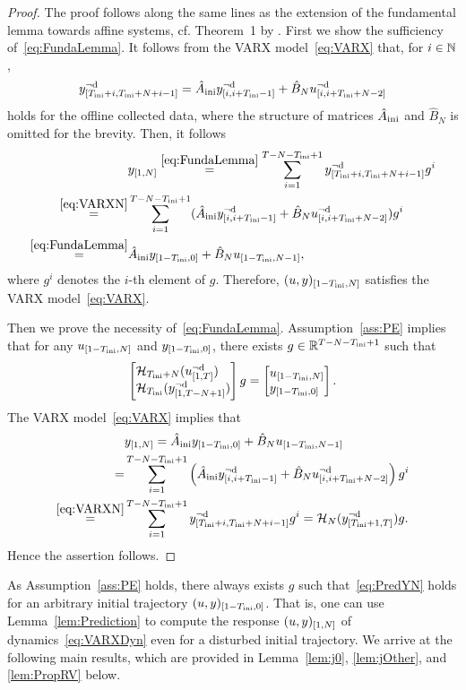 \begin{proof}
	The proof follows along the same lines as the extension of the fundamental lemma towards affine systems, cf. Theorem~1 by \citet{berberich22linear}. First we show the sufficiency of~\eqref{eq:FundaLemma}. It follows from the VARX model~\eqref{eq:VARX} that, for $i\in\mathbb{N}$,
	\begin{equation}\label{eq:VARXN}
		y_{[T_\text{ini}+i,T_\text{ini}+N+i-1]}^{\neg\mathrm{d}} = \hat{A}_{\text{ini}} y_{[i,i+T_\text{ini}-1]}^{\neg\mathrm{d}} + \hat{B}_Nu_{[i,i+T_\text{ini}+N-2]}^{\neg\mathrm{d}}
	\end{equation}
	holds for the offline collected data, where the structure of matrices $\hat{A}_{\text{ini}}$ and $\hat{B}_N$ is omitted for the brevity. Then, it follows
	\begin{align*}
		&y_{[1,N]} \overset{\eqref{eq:FundaLemma}}{=} \sum_{i=1}^{T-N-T_\text{ini}+1} y_{[T_\text{ini}+i,T_\text{ini}+N+i-1]}^{\neg\mathrm{d}}g^i\\
		\overset{\eqref{eq:VARXN}}{=} &\sum_{i=1}^{T-N-T_\text{ini}+1}  ( \hat{A}_{\text{ini}} y_{[i,i+T_\text{ini}-1]}^{\neg\mathrm{d}} + \hat{B}_Nu_{[i,i+T_\text{ini}+N-2]}^{\neg\mathrm{d}})g^i\\
		\overset{\eqref{eq:FundaLemma}}{=} &\hat{A}_{\text{ini}}y_{[1-T_\text{ini},0]} + \hat{B}_Nu_{[1-T_\text{ini},N-1]},
	\end{align*}
	where $g^i$ denotes the $i$-th element of $g$. Therefore,  $(u,y)_{[1-T_\text{ini},N]}$ satisfies the VARX model~\eqref{eq:VARX}.
	
	Then we prove the necessity of~\eqref{eq:FundaLemma}. Assumption~\ref{ass:PE} implies that for any $u_{[1-T_\text{ini},N]}$ and $y_{[1-T_\text{ini},0]}$, there exists $g\in\mathbb{R}^{T-N-T_\text{ini}+1}$ such that
	\begin{equation}\label{eq:PredYN}
		\begin{bmatrix*}[l]
			\Hankel_{\tini+N}(\traud{u}{1}{T}) \\ \Hankel_{\tini}(\traud{y}{1}{T-N+1})
		\end{bmatrix*}g = \begin{bmatrix*}[l]
			\tra{u}{1-\tini}{N} \\ \tra{y}{1-\tini}{0}
		\end{bmatrix*}.
	\end{equation}
	The VARX model~\eqref{eq:VARX} implies that
	\begin{align*}
		&y_{[1,N]} = \hat{A}_{\text{ini}}y_{[1-T_\text{ini},0]} + \hat{B}_Nu_{[1-T_\text{ini},N-1]}\\
		=& \sum_{i=1}^{T-N-T_\text{ini}+1} \left(\hat{A}_{\text{ini}} y_{[i,i+T_\text{ini}-1]}^{\neg\mathrm{d}} + \hat{B}_N u_{[i,i+T_\text{ini}+N-2]}^{\neg\mathrm{d}}\right)g^i\\
		\overset{\eqref{eq:VARXN}}{=}& \sum_{i=1}^{T-N-T_\text{ini}+1} y_{[T_\text{ini}+i,T_\text{ini}+N+i-1]}^{\neg\mathrm{d}}g^i=\mathcal{H}_{N}(y_{[T_\text{ini}+1,T]}^{\neg\mathrm{d}})g.
	\end{align*}
	Hence the assertion follows.
\end{proof}
As Assumption~\ref{ass:PE} holds, there always exists $g$ such that~\eqref{eq:PredYN} holds for an arbitrary initial trajectory $(u,y)_{[1-T_\text{ini},0]}$. That is, one can use Lemma~\ref{lem:Prediction} to compute the response $(u,y)_{[1,N]}$ of dynamics~\eqref{eq:VARXDyn} even for a disturbed initial trajectory.
We arrive at the following main results, which are provided in Lemma~\ref{lem:j0}, \ref{lem:jOther}, and \ref{lem:PropRV} below.

